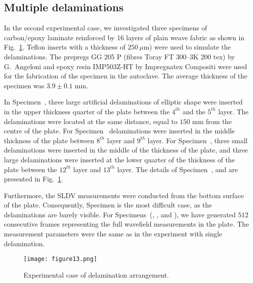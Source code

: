\subsection{Multiple delaminations}
In the second experimental case, we investigated three specimens of carbon/epoxy laminate reinforced by 16 layers of plain weave fabric as shown in Fig.~\ref{fig:plate_delam_arrangment}. 
Teflon inserts with a thickness of \(250\ \mu\)m) were used to simulate the delaminations.
The prepregs GG 205 P (fibres Toray FT 300–3K 200 tex) by G.~Angeloni and epoxy resin IMP503Z‐HT by Impregnatex Compositi were used for the fabrication of the specimen in the autoclave. 
The average thickness of the specimen was \(3.9 \pm 0.1\) mm.

In Specimen~, three large artificial delaminations of elliptic shape were inserted in the upper thickness quarter of the plate between the \(4^{th}\) and the \(5^{th}\) layer.
The delaminations were located at the same distance, equal to \(150\) mm from the centre of the plate.
For Specimen~ delaminations were inserted in the middle thickness of the plate between \(8^{th}\) layer and \(9^{th}\) layer.
For Specimen~, three small delaminations were inserted in the middle of the thickness of the plate, and three large delaminations were inserted at the lower quarter of the thickness of the plate between the \(12^{th}\) layer and \(13^{th}\) layer.
The details of Specimen~,  and  are presented in Fig.~\ref{fig:plate_delam_arrangment}.

Furthermore, the SLDV measurements were conducted from the bottom surface of the plate. 
Consequently, Specimen  is the most difficult case, as the delaminations are barely visible.
For Specimens~(, , and ),  we have generated \(512\) consecutive frames representing the full wavefield measurements in the plate.
The measurement parameters were the same as in the experiment with single delamination.
\begin{figure}[!h]
	\centering
	\texttt{[image: figure13.png]}
	\caption{Experimental case of delamination arrangement.}
	\label{fig:plate_delam_arrangment}
\end{figure}

